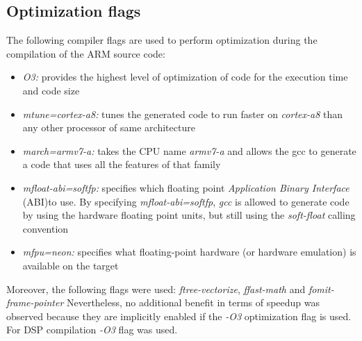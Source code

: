 \subsection{Optimization flags}
\label{sec:flag}
The following compiler flags are used to perform optimization during the compilation of the ARM source code:

\begin{itemize}
\item{\textit{O3:}} provides the highest level of optimization of code for the execution time and code size
\item{\textit{mtune=cortex-a8:}} tunes the generated code to run faster on \emph{cortex-a8} than any other processor of same architecture
\item{\textit{march=armv7-a:}} takes the CPU name \emph{armv7-a} and allows the gcc to generate a code that uses all the features of that family
\item{\textit{mfloat-abi=softfp:}} specifies which floating point \emph{Application Binary Interface} (ABI)to use. By specifying \emph{mfloat-abi=softfp}, \emph{gcc} is allowed to generate code by using the hardware floating point units, but still using the \emph{soft-float} calling convention
\item{\textit{mfpu=neon:}} specifies what floating-point hardware (or hardware emulation) is available on the target
\end{itemize}

Moreover, the following flags were used: \emph{ftree-vectorize}, \emph{ffast-math} and \emph{fomit-frame-pointer} Nevertheless, no additional benefit in terms of speedup was observed because they are implicitly enabled if the \emph{-O3} optimization flag is used. For DSP compilation \emph{-O3} flag was used.